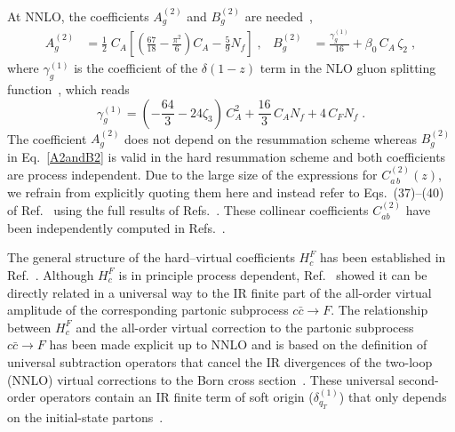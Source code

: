 \documentclass[12pt]{article}
\DeclareRobustCommand{\qt}{\ensuremath{q_T}\xspace}
\begin{document}
\begin{appendix}
At NNLO, the coefficients $A^{(2)}_{g}$ and $B^{(2)}_{g}$ are needed~\cite{Bozzi:2005wk,Catani:2013tia,deFlorian:2001zd},
\begin{align}
  A^{(2)}_{g} &= 
  \frac{1}{2}\; C_A \left[ 
    \left( \frac{67}{18} - \frac{\pi^2}{6}\right) C_A 
    -\frac{5}{9} N_f 
  \right] \;, &
  B^{(2)}_{g} &=
  \frac{\gamma_{g}^{(1)}}{16}+\beta_0\, C_A\,\zeta_2 \;,
  \label{A2andB2}
\end{align}
where $\gamma_{g}^{(1)}$ is the coefficient of the $\delta(1-z)$ term in the NLO gluon splitting function~\cite{Curci:1980uw,Furmanski:1980cm}, which reads
\begin{equation}
  \gamma_{g}^{(1)} = 
  \left(-\frac{64}3-24\zeta_3\right)\,C_A^2
  +\frac{16}3\,C_A N_f
  +4\,C_F N_f\;.
  \label{ga1g}
\end{equation}
The coefficient $A^{(2)}_{g}$ does not depend on the resummation scheme whereas $B^{(2)}_{g}$  in Eq.~\eqref{A2andB2} is valid in the hard resummation scheme and both coefficients are process independent. Due to the large size of the expressions for $C_{a \,b}^{(2)}(z)$, we refrain from explicitly quoting them here and instead refer to Eqs.~(37)--(40) of Ref.~\cite{Catani:2013tia} using the full results of Refs.~\cite{Catani:2011kr,Catani:2012qa}. These collinear coefficients $C^{(2)}_{ab}$ have been independently computed in Refs.~\cite{Gehrmann:2012ze,Echevarria:2016scs}.

The general structure of the hard--virtual coefficients $H^{F}_{c}$ has been established in Ref.~\cite{Catani:2013tia}. Although $H^{F}_{c}$ is in principle process dependent, Ref.~\cite{Catani:2013tia} showed it can be directly related in a universal way to the IR finite part of the all-order virtual amplitude of the corresponding partonic subprocess $c{\bar c}\to F$. The relationship between $H^{F}_{c}$ and the all-order virtual correction to the  partonic subprocess $c{\bar c}\to F$ has been made explicit up to NNLO and is based on the definition of universal subtraction operators that cancel the IR divergences of the two-loop (NNLO) virtual corrections to the Born cross section~\cite{Catani:1998bh}. These universal second-order operators contain an IR finite term of soft origin ($\delta^{(1)}_{\qt}$) that only depends on the initial-state partons~\cite{Catani:2013tia}.


\end{appendix}
\end{document}
